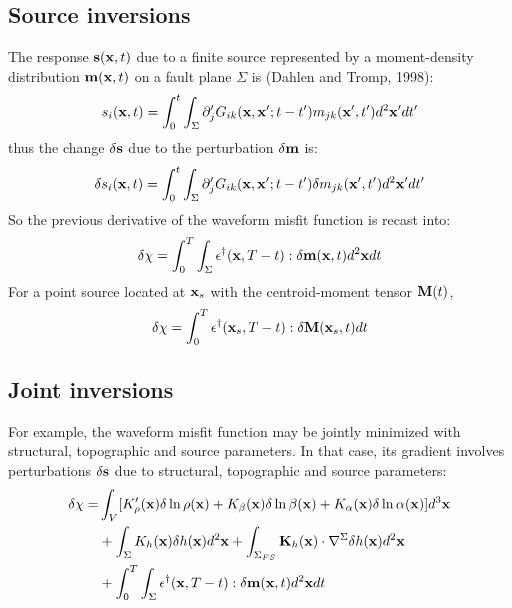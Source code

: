 \subsection{Source inversions}
The response $\mathbf{s}(\mathbf{x},t)$ due to a finite source
represented by a moment-density distribution $\mathbf{m}(\mathbf{x},t)$ on a fault plane $\Sigma$
is (Dahlen and Tromp, 1998):
\[ s_i(\mathbf{x},t)=\int_0^t\int_\Sigma\partial_j^\prime G_{ik}(\mathbf{x},\mathbf{x}';t-t')m_{jk}(\mathbf{x}',t')d^2\mathbf{x}'dt' \]
thus the change $\delta\mathbf{s}$ due to the perturbation $\delta\mathbf{m}$ is:
\[ \delta s_i(\mathbf{x},t)=\int_0^t\int_\Sigma\partial_j^\prime G_{ik}(\mathbf{x},\mathbf{x}';t-t')\delta m_{jk}(\mathbf{x}',t')d^2\mathbf{x}'dt' \]
So the previous \Frechet derivative of the waveform misfit function is recast into:
\[ \delta\chi=\int_0^T\int_\Sigma\mathbf{\epsilon}^\dagger(\mathbf{x},T-t):\delta\mathbf{m}(\mathbf{x},t)d^2\mathbf{x}dt \]
For a point source located at $\mathbf{x}_s$ with the centroid-moment tensor $\mathbf{M}(t)$,
\[ \delta\chi=\int_0^T\mathbf{\epsilon}^\dagger(\mathbf{x}_s,T-t):\delta\mathbf{M}(\mathbf{x}_s,t)dt \]

\subsection{Joint inversions}
For example, the waveform misfit function may be jointly minimized with structural,
topographic and source parameters.
In that case, its gradient involves perturbations $\delta\mathbf{s}$ due to structural,
topographic and source parameters:
\begin{align*}
  \delta\chi= & \int_V[K_\rho^\prime(\mathbf{x})\delta\ln\rho(\mathbf{x})+K_\beta(\mathbf{x})\delta\ln\beta(\mathbf{x})+K_\alpha(\mathbf{x})\delta\ln\alpha(\mathbf{x})]d^3\mathbf{x} \\
    & +\int_\Sigma K_h(\mathbf{x})\delta h(\mathbf{x})d^2\mathbf{x}+\int_{\Sigma_{FS}}\mathbf{K}_h(\mathbf{x})\cdot\nabla^\Sigma\delta h(\mathbf{x})d^2\mathbf{x} \\
	& +\int_0^T\int_\Sigma\mathbf{\epsilon}^\dagger(\mathbf{x},T-t):\delta\mathbf{m}(\mathbf{x},t)d^2\mathbf{x}dt
\end{align*}

